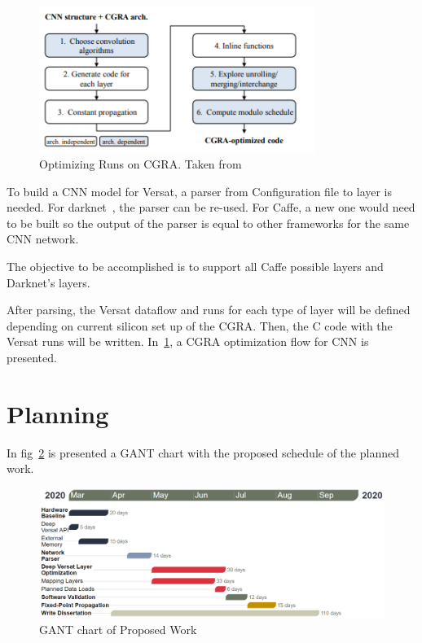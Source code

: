 \begin{figure}[!htbp]
    \centering
    \includegraphics[width=0.8\textwidth]{Figures/cgraopt.png}
    \caption{Optimizing Runs on CGRA. Taken from ~\cite{cgraopt}}
    \label{figure:cgraopt}
\end{figure}

To build a CNN model for Versat, a parser from Configuration file to layer is needed. For darknet~\cite{darknet}, the parser can be re-used.
For Caffe, a new one would need to be built so the output of the parser is equal to other frameworks for the same CNN network.

The objective to be accomplished is to support all Caffe possible layers and Darknet's layers.

After parsing, the Versat dataflow and runs for each type of layer will be defined depending on current silicon set up of the CGRA. Then,
the C code with the Versat runs will be written. In~\ref{figure:cgraopt}, a CGRA optimization flow for CNN is presented.

\newpage
\section{Planning}

In fig~\ref{figure:gant} is presented a GANT chart with the proposed schedule of the planned work.

\begin{figure}[!htbp]
    \includegraphics[width=1\textwidth]{Figures/gant2.png}
    \caption{GANT chart of Proposed Work}
    \label{figure:gant}
\end{figure}





